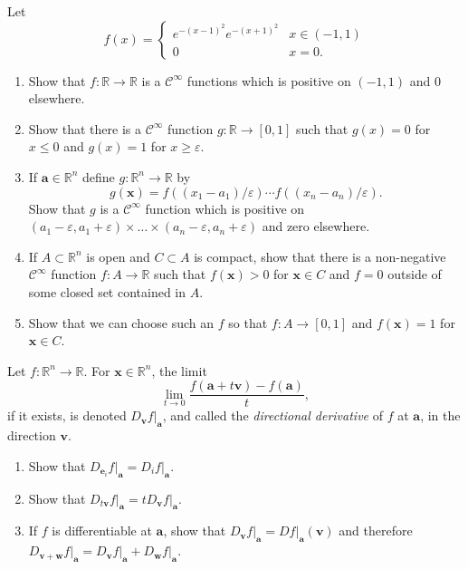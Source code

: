 \documentclass[12 pt, letterpaper]{hmcpset}
\begin{document}
\begin{problem}[26.]
	Let
	 \[
		f(x) = \begin{cases}
			e^{-(x - 1)^{2}} e^{-(x + 1)^{2}} & x \in (-1, 1) \\
			0 & x = 0.
		\end{cases}
	\]
	\begin{enumerate}
		\item Show that $f : \mathbb{R} \to \mathbb{R}$ is a $\mathcal{C}^{\infty}$ functions which is positive on $(-1, 1)$ and $0$ elsewhere.
		\item Show that there is a $\mathcal{C}^{\infty}$ function $g : \mathbb{R} \to [0, 1]$ such that $g(x) = 0$ for $x \le 0$ and $g(x) = 1$ for $x \ge \varepsilon$.
		\item If $\mathbf{a} \in \mathbb{R}^{n}$ define $g : \mathbb{R}^{n} \to \mathbb{R}$ by
			\[
				g(\mathbf{x}) = f((x_{1} - a_{1})/\varepsilon) \cdots f((x_{n} - a_{n})/\varepsilon).
			\]
			Show that $g$ is a $\mathcal{C}^{\infty}$ function which is positive on $(a_{1} - \varepsilon, a_{1} + \varepsilon) \times \dots \times (a_{n} - \varepsilon, a_{n} + \varepsilon)$ and zero elsewhere.
		\item If $A \subset \mathbb{R}^{n}$ is open and $C \subset A$ is compact, show that there is a non-negative $\mathcal{C}^{\infty}$ function $f : A \to \mathbb{R}$ such that $f(\mathbf{x}) > 0$ for $\mathbf{x} \in C$ and $f = 0$ outside of some closed set contained in $A$.
		\item Show that we can choose such an $f$ so that $f: A \to [0, 1]$ and $f(\mathbf{x}) = 1$ for $\mathbf{x} \in C$.
	\end{enumerate}
\end{problem}

\pagebreak

\begin{problem}[29.]
	Let $f : \mathbb{R}^{n} \to \mathbb{R}$. For $\mathbf{x} \in \mathbb{R}^{n}$, the limit
	\[
		\lim_{t \to 0} \frac{f(\mathbf{a} + t \mathbf{v}) - f(\mathbf{a})}{t},
	\]
	if it exists, is denoted $D_{\mathbf{v}} f \Big |_{\mathbf{a}}$, and called the \textit{directional derivative} of $f$ at $\mathbf{a}$, in the direction $\mathbf{v}$.
	\begin{enumerate}
		\item Show that $D_{\mathbf{e}_{i}} f \Big |_{\mathbf{a}} = D_{i} f \Big |_{\mathbf{a}}$.
		\item Show that $D_{t\mathbf{v}} f \Big |_{\mathbf{a}} = t D_{\mathbf{v}} f \Big |_{\mathbf{a}}$.
		\item If $f$ is differentiable at $\mathbf{a}$, show that $D_{\mathbf{v}} f \Big |_{\mathbf{a}} = Df \Big |_{\mathbf{a}} (\mathbf{v})$ and therefore $D_{\mathbf{v} + \mathbf{w}} f \Big |_{\mathbf{a}} = D_{\mathbf{v}} f \Big |_{\mathbf{a}} + D_{\mathbf{w}} f \Big |_{\mathbf{a}}$.
	\end{enumerate}
\end{problem}
\end{document}
